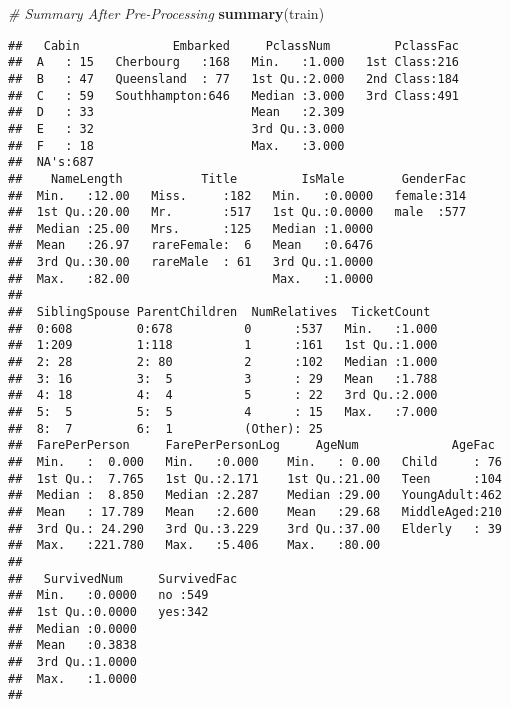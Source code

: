 \documentclass[]{article}
\newenvironment{Shaded}{\begin{snugshade}}{\end{snugshade}}
\newcommand{\KeywordTok}[1]{\textcolor[rgb]{0.13,0.29,0.53}{\textbf{#1}}}
\newcommand{\CommentTok}[1]{\textcolor[rgb]{0.56,0.35,0.01}{\textit{#1}}}
\newcommand{\NormalTok}[1]{#1}
\begin{document}
\begin{Shaded}
\begin{Highlighting}[]
\CommentTok{# Summary After Pre-Processing}
\KeywordTok{summary}\NormalTok{(train)}
\end{Highlighting}
\end{Shaded}

\begin{verbatim}
##   Cabin             Embarked     PclassNum         PclassFac  
##  A   : 15   Cherbourg   :168   Min.   :1.000   1st Class:216  
##  B   : 47   Queensland  : 77   1st Qu.:2.000   2nd Class:184  
##  C   : 59   Southhampton:646   Median :3.000   3rd Class:491  
##  D   : 33                      Mean   :2.309                  
##  E   : 32                      3rd Qu.:3.000                  
##  F   : 18                      Max.   :3.000                  
##  NA's:687                                                     
##    NameLength           Title         IsMale        GenderFac  
##  Min.   :12.00   Miss.     :182   Min.   :0.0000   female:314  
##  1st Qu.:20.00   Mr.       :517   1st Qu.:0.0000   male  :577  
##  Median :25.00   Mrs.      :125   Median :1.0000               
##  Mean   :26.97   rareFemale:  6   Mean   :0.6476               
##  3rd Qu.:30.00   rareMale  : 61   3rd Qu.:1.0000               
##  Max.   :82.00                    Max.   :1.0000               
##                                                                
##  SiblingSpouse ParentChildren  NumRelatives  TicketCount   
##  0:608         0:678          0      :537   Min.   :1.000  
##  1:209         1:118          1      :161   1st Qu.:1.000  
##  2: 28         2: 80          2      :102   Median :1.000  
##  3: 16         3:  5          3      : 29   Mean   :1.788  
##  4: 18         4:  4          5      : 22   3rd Qu.:2.000  
##  5:  5         5:  5          4      : 15   Max.   :7.000  
##  8:  7         6:  1          (Other): 25                  
##  FarePerPerson     FarePerPersonLog     AgeNum             AgeFac   
##  Min.   :  0.000   Min.   :0.000    Min.   : 0.00   Child     : 76  
##  1st Qu.:  7.765   1st Qu.:2.171    1st Qu.:21.00   Teen      :104  
##  Median :  8.850   Median :2.287    Median :29.00   YoungAdult:462  
##  Mean   : 17.789   Mean   :2.600    Mean   :29.68   MiddleAged:210  
##  3rd Qu.: 24.290   3rd Qu.:3.229    3rd Qu.:37.00   Elderly   : 39  
##  Max.   :221.780   Max.   :5.406    Max.   :80.00                   
##                                                                     
##   SurvivedNum     SurvivedFac
##  Min.   :0.0000   no :549    
##  1st Qu.:0.0000   yes:342    
##  Median :0.0000              
##  Mean   :0.3838              
##  3rd Qu.:1.0000              
##  Max.   :1.0000              
## 
\end{verbatim}
\end{document}
